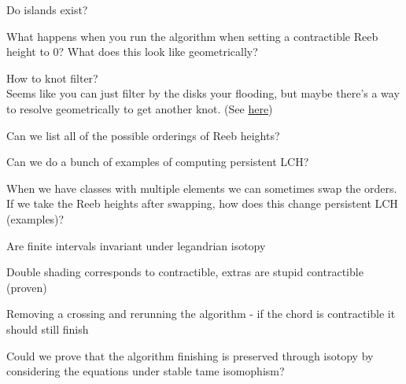 \documentclass[General-Information/editedlog.tex]{subfiles}
\begin{document}
\begin{question}
    Do islands exist?
\end{question}

\begin{question}
    What happens when you run the algorithm when setting a contractible Reeb height to 0? What does this look like geometrically?
\end{question}

\begin{question}
    How to knot filter? \\
    Seems like you can just filter by the disks your flooding, but maybe there's a way to resolve geometrically to get another knot. (See \href{http://www.math.titech.ac.jp/~kalman/cobordism-talk.pdf}{here})
\end{question}



\begin{question}

Can we list all of the possible orderings of Reeb heights?
\end{question}

\begin{question}

Can we do a bunch of examples of computing persistent LCH?
\end{question}

\begin{question}
When we have classes with multiple elements we can sometimes swap the orders. If we take the Reeb heights after swapping, how does this change persistent LCH (examples)?
\end{question}

\begin{question}
Are finite intervals invariant under legandrian isotopy
\end{question}

\begin{question}
Double shading corresponds to contractible, extras are stupid contractible (proven)

\end{question}

\begin{question}
Removing a crossing and rerunning the algorithm - if the chord is contractible it should still finish
\end{question}

\begin{question}
Could we prove that the algorithm finishing is preserved through isotopy by considering the equations under stable tame isomophism?
\end{question}
\end{document}
